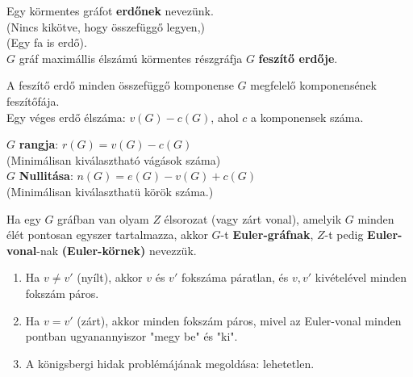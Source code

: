 \documentclass{beamer}
\newcommand{\mmedskip}{\vspace{0.5em}}
\begin{document}
\begin{frame}
\begin{tcolorbox}[title={Erdő, Feszítő erdő}]
Egy körmentes gráfot \textbf{erdőnek} nevezünk.\\
(Nincs kikötve, hogy összefüggő legyen,)\\
(Egy fa is erdő).\\
\mmedskip
$G$ gráf maximállis élszámú körmentes részgráfja $G$ \textbf{feszítő erdője}.
\end{tcolorbox}

\begin{tcolorbox}[title={Ész}]
A feszítő erdő minden összefüggő komponense $G$ megfelelő komponensének feszítőfája.\\
\mmedskip
Egy véges erdő élszáma: $v(G) - c(G)$, ahol $c$ a komponensek száma.
\end{tcolorbox}

\begin{tcolorbox}[title={Rang, Nullitás}]
$G$ \textbf{rangja}: $r(G) = v(G) - c(G)$\\
(Minimálisan kiválasztható vágások száma)\\
\mmedskip
$G$ \textbf{Nullitása}: $n(G) = e(G) - v(G) + c(G)$\\
(Minimálisan kiválaszthatü körök száma.)
\end{tcolorbox}
\end{frame}

\begin{frame}
\begin{tcolorbox}[title={Def.: Euler gráfok}]
Ha egy $G$ gráfban van olyam $Z$ élsorozat (vagy zárt vonal), amelyik $G$ minden élét pontosan egyszer tartalmazza, akkor $G$-t \textbf{Euler-gráfnak}, $Z$-t pedig \textbf{Euler-vonal}-nak \textbf{(Euler-körnek)} nevezzük.
\end{tcolorbox}
\begin{tcolorbox}[title={Ész}]
\begin{enumerate}
\item Ha $v \neq v'$ (nyílt), akkor $v$ és $v'$ fokszáma páratlan, és $v, v'$ kivételével minden fokszám páros.
\item Ha $v = v'$ (zárt), akkor minden fokszám páros, mivel az Euler-vonal minden pontban ugyanannyiszor "megy be" és "ki".
\item A königsbergi hidak problémájának megoldása: lehetetlen.
\end{enumerate}
\end{tcolorbox}
\end{frame}
\end{document}
